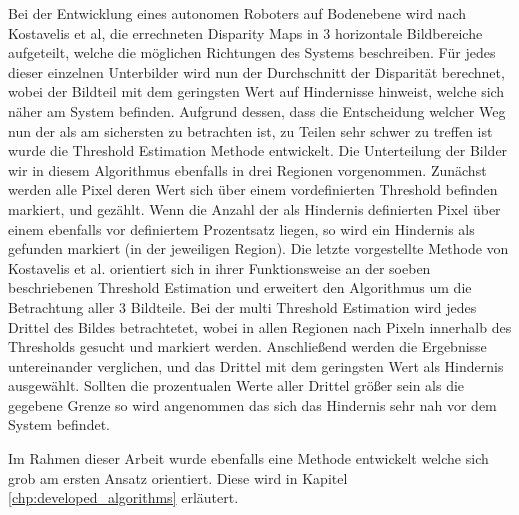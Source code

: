 \noindent
Bei der Entwicklung eines autonomen Roboters auf Bodenebene wird nach Kostavelis et al, \cite{kostavelis2010comparative} die errechneten Disparity Maps in 3 horizontale Bildbereiche aufgeteilt, welche die möglichen Richtungen des Systems beschreiben. Für jedes dieser einzelnen Unterbilder wird nun der Durchschnitt der Disparität berechnet, wobei der Bildteil mit dem geringsten Wert auf Hindernisse hinweist, welche sich näher am System befinden. Aufgrund dessen, dass die Entscheidung welcher Weg nun der als am sichersten zu betrachten ist, zu Teilen sehr schwer zu treffen ist wurde die Threshold Estimation Methode entwickelt.
Die Unterteilung der Bilder wir in diesem Algorithmus ebenfalls in drei Regionen vorgenommen. Zunächst werden alle Pixel deren Wert sich über einem vordefinierten Threshold befinden markiert, und gezählt. Wenn die Anzahl der als Hindernis definierten Pixel über einem ebenfalls vor definiertem Prozentsatz liegen, so wird ein Hindernis als gefunden markiert (in der jeweiligen Region). Die letzte vorgestellte Methode von Kostavelis et al. orientiert sich in ihrer Funktionsweise an der soeben beschriebenen Threshold Estimation und erweitert den Algorithmus um die Betrachtung aller 3 Bildteile.
Bei der multi Threshold Estimation wird jedes Drittel des Bildes betrachtetet, wobei in allen Regionen nach Pixeln innerhalb des Thresholds gesucht und markiert werden. Anschließend werden die Ergebnisse untereinander verglichen, und das Drittel mit dem geringsten Wert als Hindernis ausgewählt. Sollten die prozentualen Werte aller Drittel größer sein als die gegebene Grenze so wird angenommen das sich das Hindernis sehr nah vor dem System befindet.

Im Rahmen dieser Arbeit wurde ebenfalls eine Methode entwickelt welche sich grob am ersten Ansatz orientiert. Diese wird in Kapitel \ref{chp:developed_algorithms} erläutert.\\

